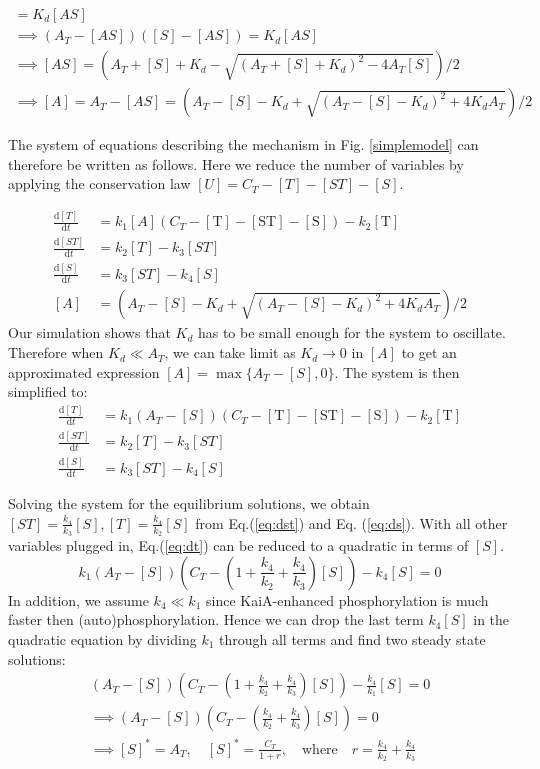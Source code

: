 \documentclass[a4paper,10pt]{article}
\numberwithin{equation}{section}
\begin{document}
\begin{gather*}
[A][S_{\mathrm{free}}]=K_d[AS]\\
\implies (A_T-[AS])([S]-[AS])=K_d[AS]\\
\implies 
[AS]=\left(A_T+[S]+K_d-\sqrt{(A_T+[S]+K_d)^2-4A_T[S]}\right)/2\\
\implies 
[A]=A_T-[AS]=\left(A_T-[S]-K_d+\sqrt{(A_T-[S]-K_d)^2+4K_dA_T}\right)/2
\end{gather*}


The system of equations describing the mechanism in Fig. \ref{simplemodel} can therefore be written as follows.  Here we reduce the number of variables by applying the conservation law $[U]=C_T-[T]-[ST]-[S]$.  



\begin{align*}
\frac{\mathrm{d}[T]}{\mathrm{d}t}&=k_1 [A] (C_T-\mathrm{[T]}-\mathrm{[ST]}-\mathrm{[S]})-k_2 \mathrm{[T]}\\
\frac{\mathrm{d}[ST]}{\mathrm{d}t}&=k_2 [T]-k_3 [ST]\\
\frac{\mathrm{d}[S]}{\mathrm{d}t}&=k_3 [ST]-k_4 [S]\\
[A]&=\left(A_T-[S]-K_d+\sqrt{(A_T-[S]-K_d)^2+4K_dA_T}\right)/2
\end{align*}
Our simulation shows that $K_d$ has to be small enough for the system to oscillate. Therefore when $K_d\ll A_T$, we can take limit as $K_d\to 0$ in $[A]$ to get an approximated expression $[A]=\max\{ A_T-[S],0 \}$.
The system is then simplified to:
\begin{align}
\frac{\mathrm{d}[T]}{\mathrm{d}t}&=k_1 (A_T-[S]) (C_T-\mathrm{[T]}-\mathrm{[ST]}-\mathrm{[S]})-k_2 \mathrm{[T]}\label{eq:dt}\\
\frac{\mathrm{d}[ST]}{\mathrm{d}t}&=k_2 [T]-k_3 [ST]\label{eq:dst}\\
\frac{\mathrm{d}[S]}{\mathrm{d}t}&=k_3 [ST]-k_4 [S]\label{eq:ds}
\end{align}

Solving the system for the equilibrium solutions, we obtain $[ST]=\frac{k_4}{k_3} [S],[T]=\frac{k_4}{k_2}  [S]$ from Eq.(\ref{eq:dst}) and Eq. (\ref{eq:ds}). With all other variables plugged in, Eq.(\ref{eq:dt}) can be reduced to a quadratic in terms of $[S]$.
\[k_1(A_T-[S])(C_T-(1+\frac{k_4}{k_2}+\frac{k_4}{k_3})[S])-k_4[S]=0\] 
In addition, we assume $k_4\ll k_1$ since KaiA-enhanced phosphorylation is much faster then (auto)phosphorylation. Hence we can drop the last term $k_4[S]$ in the quadratic equation by dividing $k_1$ through all terms and find two steady state solutions:
\begin{gather*}
(A_T-[S])(C_T-(1+\frac{k_4}{k_2}+\frac{k_4}{k_3})[S])-\frac{k_4}{k_1}[S]=0\\
\implies
(A_T-[S])(C_T-(\frac{k_4}{k_2}+\frac{k_4}{k_3})[S])=0\\
\implies [S]^*=A_T, \quad [S]^*=\frac{C_T}{1+r}, \quad \mathrm{where}\quad r=\frac{k_4}{k_2}+\frac{k_4}{k_3}
\end{gather*}
\end{document}
